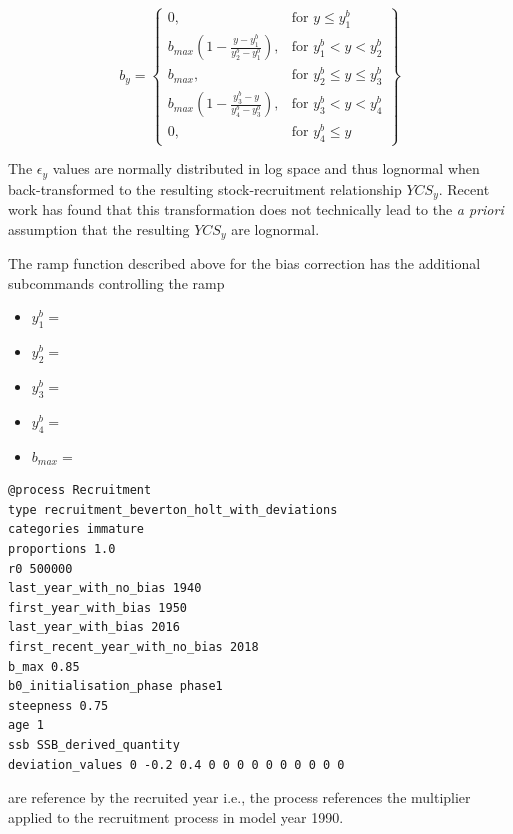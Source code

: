 \begin{equation}\label{eq::bias}
b_y = \left\{\begin{array}{lr}
0, & \text{for }y\leq y_1^b\\
b_{max}(1 - \frac{y - y_1^b}{y_2^b - y_1^b}), & \text{for } y_1^b < y < y_2^b\\
b_{max}, & \text{for } y_2^b\leq y \leq y_3^b\\
b_{max}(1 - \frac{y_3^b - y}{y_4^b - y_3^b}), & \text{for }  y_3^b< y < y_4^b\\
0, & \text{for } y_4^b\leq y
\end{array}\right\}
\end{equation}

The $\epsilon_y$ values are normally distributed in log space and thus lognormal when back-transformed to the resulting stock-recruitment relationship $YCS_y$. Recent work has found that this transformation does not technically lead to the \textit{a priori} assumption that the resulting $YCS_y$ are lognormal. 

The ramp function described above for the bias correction has the additional subcommands controlling the ramp

\begin{itemize}
	\item $y_1^b = $ 
	\item $y_2^b = $ 
	\item $y_3^b = $ 
	\item $y_4^b = $ 
	\item $b_{max} = $ 
\end{itemize}

{\small{\begin{verbatim}
@process Recruitment
type recruitment_beverton_holt_with_deviations
categories immature
proportions 1.0
r0 500000
last_year_with_no_bias 1940
first_year_with_bias 1950
last_year_with_bias 2016
first_recent_year_with_no_bias 2018
b_max 0.85
b0_initialisation_phase phase1
steepness 0.75
age 1
ssb SSB_derived_quantity
deviation_values 0 -0.2 0.4 0 0 0 0 0 0 0 0 0 0
\end{verbatim}}}

 are reference by the recruited year i.e., the  process  references the multiplier applied to the recruitment process in model year 1990.

